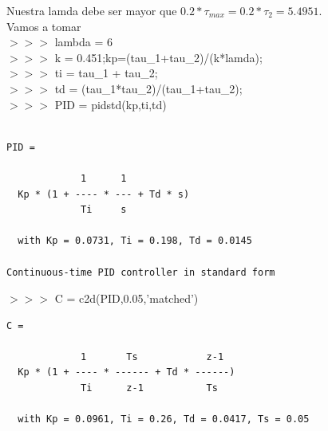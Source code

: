\begin{tcolorbox}[sharp corners, colframe=bluebox, title= Controlador
  síntesis directa, breakable=unlimited]
Nuestra lamda debe ser mayor que $0.2*\tau_{max} = 0.2 *\tau_2 = 5.4951$.\\
Vamos a tomar\\
$>>>$ lambda = 6\\
$>>>$ k = 0.451;kp=(tau\_1+tau\_2)/(k*lamda);\\
$>>>$ ti = tau\_1 + tau\_2;\\
$>>>$ td = (tau\_1*tau\_2)/(tau\_1+tau\_2);\\
$>>>$ PID = pidstd(kp,ti,td)\\

  \vspace*{0.5em}
  \begin{tcolorbox}[sharp corners, colback = white]
    \color{gray}
\begin{verbatim}

PID =
 
             1      1          
  Kp * (1 + ---- * --- + Td * s)
             Ti     s          

  with Kp = 0.0731, Ti = 0.198, Td = 0.0145
 
Continuous-time PID controller in standard form
\end{verbatim}
  \end{tcolorbox}%
  \vspace*{0.5em}

$>>>$ C = c2d(PID,0.05,'matched')

    \vspace*{0.5em}
  \begin{tcolorbox}[sharp corners, colback = white]
    \color{gray}
\begin{verbatim}
C =
 
             1       Ts            z-1 
  Kp * (1 + ---- * ------ + Td * ------)
             Ti      z-1           Ts  

  with Kp = 0.0961, Ti = 0.26, Td = 0.0417, Ts = 0.05
 

\end{verbatim}
\end{tcolorbox}
\end{tcolorbox}
